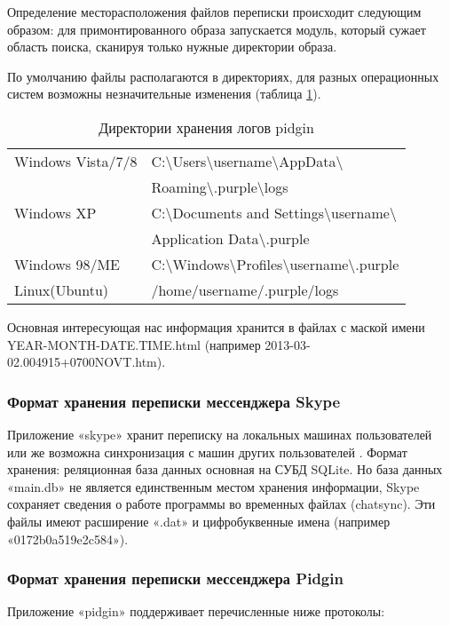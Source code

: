 Определение месторасположения файлов переписки происходит следующим образом: для примонтированного образа запускается модуль, который сужает область поиска, сканируя только нужные директории образа. 

По умолчанию файлы располагаются в директориях, для разных операционных систем возможны незначительные изменения (таблица \ref{tab:pidgin}). 

\begin{table}[h!]
\caption{Директории хранения логов pidgin}
\label{tab:pidgin}
\begin{tabularx}{\linewidth}{|l|X|}
\hline
Windows Vista/7/8 & C:\textbackslash Users\textbackslash username\textbackslash  AppData\textbackslash \tabularnewline &  Roaming\textbackslash .purple\textbackslash  logs \tabularnewline 
\hline 
Windows XP & C:\textbackslash  Documents and Settings\textbackslash  username\textbackslash \tabularnewline & Application Data\textbackslash .purple\tabularnewline
\hline 
Windows 98/ME 	& C:\textbackslash Windows\textbackslash Profiles\textbackslash username\textbackslash.purple \tabularnewline
\hline 
Linux(Ubuntu) &	/home/username/.purple/logs \tabularnewline 
\hline
\end{tabularx}
\end{table}

Основная интересующая нас информация хранится в файлах с маской имени YEAR-MONTH-DATE.TIME.html (например 2013-03-02.004915+0700NOVT.htm).

\subsubsection{Формат хранения переписки мессенджера Skype}

Приложение «skype» хранит переписку на локальных машинах пользователей или же возможна синхронизация с машин других пользователей \cite{skypechat}. Формат хранения: реляционная база данных основная на СУБД SQLite.
Но база данных «main.db» не является единственным местом хранения информации, Skype сохраняет сведения о работе программы во временных файлах (chatsync). Эти файлы имеют расширение «.dat» и цифробуквенные имена (например «0172b0a519e2c584»)\cite{cfl}.

\subsubsection{Формат хранения переписки мессенджера Pidgin}
Приложение «pidgin» поддерживает перечисленные ниже протоколы: \cite{ofpidgin}

